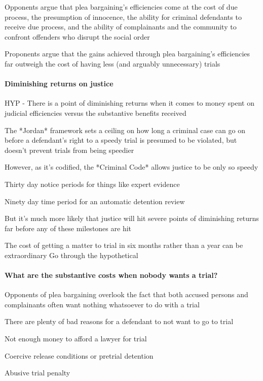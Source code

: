 Opponents argue that plea bargaining's efficiencies come at the cost of due process, the presumption of innocence, the ability for criminal defendants to receive due process, and the ability of complainants and the community to confront offenders who disrupt the social order

Proponents argue that the gains achieved through plea bargaining's efficiencies far outweigh the cost of having less (and arguably unnecessary) trials

\paragraph{Diminishing returns on justice}

HYP - There is a point of diminishing returns when it comes to money spent on judicial efficiencies versus the substantive benefits received

The *Jordan* framework sets a ceiling on how long a criminal case can go on before a defendant's right to a speedy trial is presumed to be violated, but doesn't prevent trials from being speedier

However, as it's codified, the *Criminal Code* allows justice to be only so speedy

Thirty day notice periods for things like expert evidence

Ninety day time period for an automatic detention review

But it's much more likely that justice will hit severe points of diminishing returns far before any of these milestones are hit

The cost of getting a matter to trial in six months rather than a year can be extraordinary
Go through the hypothetical

\paragraph{What are the substantive costs when nobody wants a trial?}

Opponents of plea bargaining overlook the fact that both accused persons and complainants often want nothing whatsoever to do with a trial

There are plenty of bad reasons for a defendant to not want to go to trial

Not enough money to afford a lawyer for trial

Coercive release conditions or pretrial detention

Abusive trial penalty

